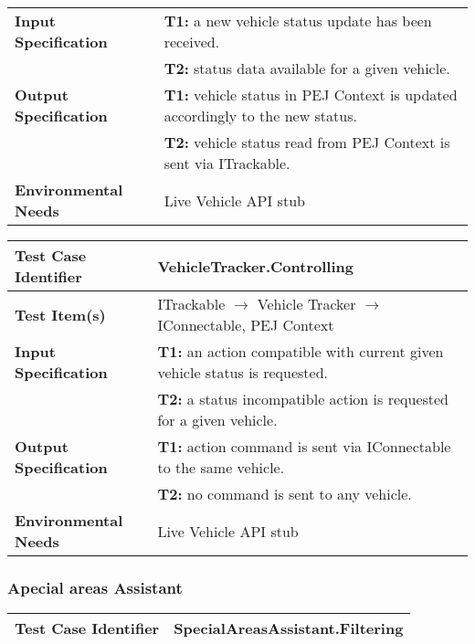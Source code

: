 {\begin{tabularx}{\textwidth}{l X}
    \textbf{Input Specification} & \textbf{T1:} a new vehicle status update has been received.\\
                                & \textbf{T2:} status data available for a given vehicle.\\
    \hline 
    
    \textbf{Output Specification} & \textbf{T1:} vehicle status in PEJ Context is updated accordingly to the new status.\\
    & \textbf{T2:} vehicle status read from PEJ Context is sent via ITrackable.\\
    \hline 
    
    \textbf{Environmental Needs} & Live Vehicle API stub\\
    \hline
\end{tabularx}
\bigskip 

\noindent
\begin{tabularx}{\textwidth}{l X}
    \hline 
    \textbf{Test Case Identifier} & VehicleTracker.Controlling\\ 
    \hline 
    
    \textbf{Test Item(s)} & ITrackable $\rightarrow$ Vehicle Tracker $\rightarrow$ IConnectable, PEJ Context\\
    \hline 
    
    \textbf{Input Specification} & \textbf{T1:} an action compatible with current given vehicle status is requested.\\
                                & \textbf{T2:} a status incompatible action is requested for a given vehicle.\\
    \hline 
    
    \textbf{Output Specification} & \textbf{T1:} action command is sent via IConnectable to the same vehicle.\\
                                & \textbf{T2:} no command is sent to any vehicle.\\
    \hline 
    
    \textbf{Environmental Needs} & Live Vehicle API stub\\
    \hline
\end{tabularx}

\noindent 
\subsubsection{Apecial areas Assistant}
\begin{tabularx}{\textwidth}{l X}
    \hline 
    \textbf{Test Case Identifier} & SpecialAreasAssistant.Filtering\\ 
    \hline 
    

\end{tabularx}}
